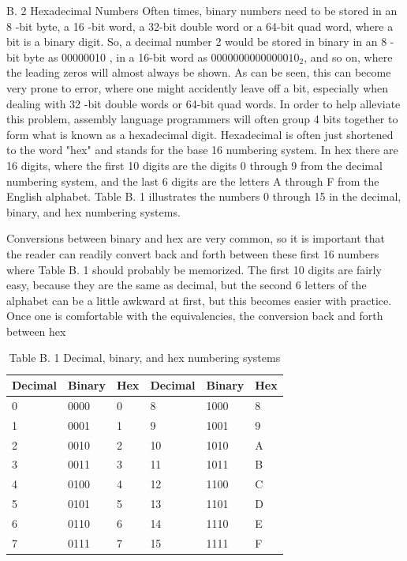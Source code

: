\documentclass[10pt]{book}
\begin{document}
B. 2 Hexadecimal Numbers
Often times, binary numbers need to be stored in an 8 -bit byte, a 16 -bit word, a 32-bit double word or a 64-bit quad word, where a bit is a binary digit. So, a decimal number 2 would be stored in binary in an 8 -bit byte as 00000010 , in a 16-bit word as $0000000000000010_{2}$, and so on, where the leading zeros will almost always be shown. As can be seen, this can become very prone to error, where one might accidently leave off a bit, especially when dealing with 32 -bit double words or 64-bit quad words. In order to help alleviate this problem, assembly language programmers will often group 4 bits together to form what is known as a hexadecimal digit. Hexadecimal is often just shortened to the word "hex" and stands for the base 16 numbering system. In hex there are 16 digits, where the first 10 digits are the digits 0 through 9 from the decimal numbering system, and the last 6 digits are the letters A through F from the English alphabet. Table B. 1 illustrates the numbers 0 through 15 in the decimal, binary, and hex numbering systems.

Conversions between binary and hex are very common, so it is important that the reader can readily convert back and forth between these first 16 numbers where Table B. 1 should probably be memorized. The first 10 digits are fairly easy, because they are the same as decimal, but the second 6 letters of the alphabet can be a little awkward at first, but this becomes easier with practice. Once one is comfortable with the equivalencies, the conversion back and forth between hex

\begin{table}[htbp]
\begin{center}
\captionsetup{labelformat=empty}
\caption{Table B. 1 Decimal, binary, and hex numbering systems}
\begin{tabular}{|l|l|l|l|l|l|}
\hline
Decimal & Binary & Hex & Decimal & Binary & Hex \\
\hline
0 & 0000 & 0 & 8 & 1000 & 8 \\
\hline
1 & 0001 & 1 & 9 & 1001 & 9 \\
\hline
2 & 0010 & 2 & 10 & 1010 & A \\
\hline
3 & 0011 & 3 & 11 & 1011 & B \\
\hline
4 & 0100 & 4 & 12 & 1100 & C \\
\hline
5 & 0101 & 5 & 13 & 1101 & D \\
\hline
6 & 0110 & 6 & 14 & 1110 & E \\
\hline
7 & 0111 & 7 & 15 & 1111 & F \\
\hline
\end{tabular}
\end{center}
\end{table}
\end{document}
